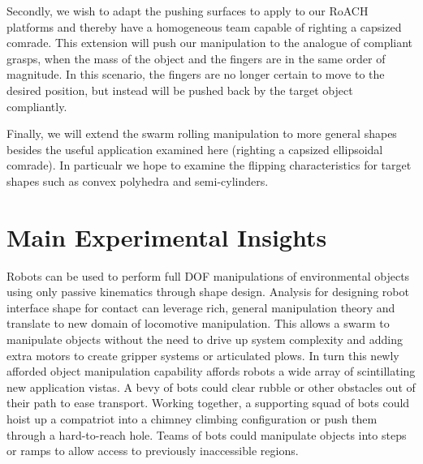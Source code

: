 \documentclass[runningheads,a4paper]{llncs}
\begin{document}
Secondly, we wish to adapt the pushing surfaces to apply to our RoACH platforms and thereby have a homogeneous team capable of righting a capsized comrade.
This extension will push our manipulation to the analogue of compliant grasps, when the mass of the object and the fingers are in the same order of magnitude.
In this scenario, the fingers are no longer certain to move to the desired position, but instead will be pushed back by the target object compliantly.

Finally, we will extend the swarm rolling manipulation to more general shapes besides the useful application examined here (righting a capsized ellipsoidal comrade).
In particualr we hope to examine the flipping characteristics for target shapes such as convex polyhedra and semi-cylinders.

\section{Main Experimental Insights}
Robots can be used to perform full DOF manipulations of environmental objects using only passive kinematics through shape design.
Analysis for designing robot interface shape for contact can leverage rich, general manipulation theory and translate to new domain of locomotive manipulation.
This allows a swarm to manipulate objects without the need to drive up system complexity and adding extra motors to create gripper systems or articulated plows.
In turn this newly afforded object manipulation capability affords robots a wide array of scintillating new application vistas.
A bevy of bots could clear rubble or other obstacles out of their path to ease transport.
Working together, a supporting squad of bots could hoist up a compatriot into a chimney climbing configuration or push them through a hard-to-reach hole.
Teams of bots could manipulate objects into steps or ramps to allow access to previously inaccessible regions.

\clearpage


\end{document}
